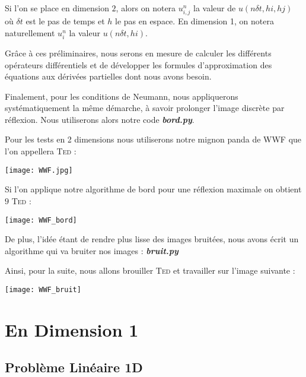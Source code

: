 \documentclass[a4paper,12pt,twoside]{report}
\newcommand{\1}{\mathbb{1}}
\begin{document}
	
	Si l'on se place en dimension $2$, alors on notera $u^{n}_{i,j}$ la valeur de $u(n\delta t,hi,hj)$ où $\delta t$ est le pas de temps et $h$ le pas en espace. En dimension 1, on notera naturellement $u_i^n$ la valeur $u(n\delta t, hi)$.
	
	Grâce à ces préliminaires, nous serons en mesure de calculer les différents opérateurs différentiels et de développer les formules d'approximation des équations aux dérivées partielles dont nous avons besoin.
	
	Finalement, pour les conditions de Neumann, nous appliquerons systématiquement la même démarche, à savoir prolonger l'image discrète par réflexion. Nous utiliserons alors notre code \textbf{\emph{bord.py}}.
	
	
	Pour les tests en 2 dimensions nous utiliserons notre mignon panda de WWF que l'on appellera \textsc{Ted} : 
	
	\begin{center}
		\texttt{[image: WWF.jpg]}
	\end{center}
	
	Si l'on applique notre algorithme de bord pour une réflexion maximale on obtient $9$ \textsc{Ted} :
	
	\begin{center}
		\texttt{[image: WWF\_bord]}
	\end{center}

	De plus, l'idée étant de rendre plus lisse des images bruitées, nous avons écrit un algorithme qui va bruiter nos images : \emph{\textbf{bruit.py}}
	
	
	Ainsi, pour la suite, nous allons brouiller \textsc{Ted} et travailler sur l'image suivante : 
	
	\begin{center}
		\texttt{[image: WWF\_bruit]}
	\end{center}
	
		
	\chapter*{En Dimension 1}
	
	\section*{Problème Linéaire 1D}
	
\end{document}
